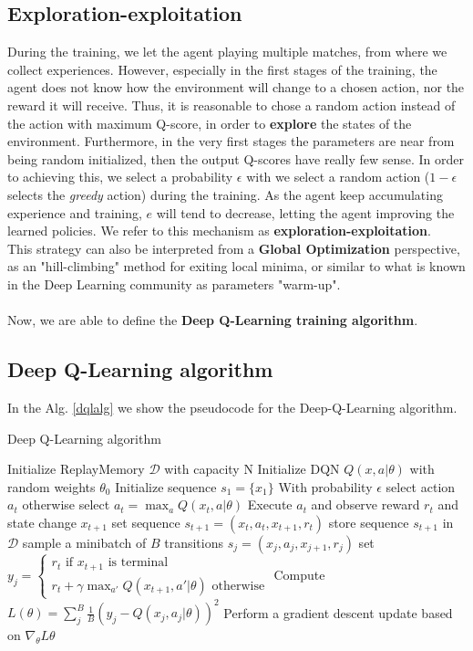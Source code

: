 \documentclass{article}
\begin{document}
\subsection{Exploration-exploitation}
During the training, we let the agent playing multiple matches, from where we collect experiences. However, especially in the first stages of the training, the agent does not know how the environment will change to a chosen action, nor the reward it will receive. Thus, it is reasonable to chose a random action instead of the action with maximum Q-score, in order to \textbf{explore} the states of the environment. Furthermore, in the very first stages the parameters are near from being random initialized, then the output Q-scores have really few sense. In order to achieving this, we select a probability $\epsilon$ with we select a random action ($1 - \epsilon$ selects the \textit{greedy} action) during the training. As the agent keep accumulating experience and training, $e$ will tend to decrease, letting the agent improving the learned policies. We refer to this mechanism as \textbf{exploration-exploitation}.\\
This strategy can also be interpreted from a \textbf{Global Optimization} perspective, as an "hill-climbing" method for exiting local minima, or similar to what is known in the Deep Learning community as parameters "warm-up".
\\
\\
Now, we are able to define the \textbf{Deep Q-Learning training algorithm}.
\subsection{Deep Q-Learning algorithm}

In the Alg. \ref{dqlalg} we show the pseudocode for the Deep-Q-Learning algorithm.
\begin{algorithm}[H]
	\caption{Deep Q-Learning algorithm}
	\label{dqlalg}
	\begin{algorithmic}
		\State Initialize ReplayMemory $\mathcal{D}$ with capacity N
		\State Initialize DQN $Q(x, a|\theta)$ with random weights $\theta_0$
		\State Initialize sequence $s_1=\{x_1\}$
			\State With probability $\epsilon$ select action $a_t$ 
			\State otherwise select $a_t=\max_{a}Q(x_t, a|\theta)$
			\State Execute $a_t$ and observe reward $r_t$ and state change $x_{t+1}$
			\State set sequence $s_{t+1}=(x_t, a_t, x_{t+1}, r_t)$ 
			\State store sequence $s_{t+1}$ in $\mathcal{D}$
			\State sample a minibatch of $B$ transitions $s_j=(x_j, a_j, x_{j+1}, r_j)$
			\State set $y_j = 
			\begin{cases}
				r_t \text{ if $x_{t+1}$ is terminal} \\
				r_t + \gamma\max_{a'}Q(x_{t+1}, a'|\theta) \text{ otherwise}
			\end{cases}
			$
			\State Compute $L(\theta) = \sum_{j}^{B} \frac{1}{B} (y_j - Q(x_j, a_j|\theta) )^2 $
			\State Perform a gradient descent update based on $\nabla_\theta L\theta$
		\EndFor		
		\EndFor
	\end{algorithmic}
\end{algorithm}
\end{document}
